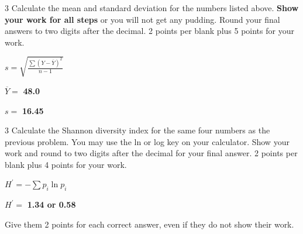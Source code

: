 \showpoints


\question[9]
\begin{multicols}{3}
Calculate the mean and standard deviation for the numbers listed above.
\textbf{Show your work for all steps} or you will not get any pudding. Round your final answers to two digits after the decimal.
2 points per blank plus 5 points for your work. 

\columnbreak

\hfil $ s = \sqrt{\frac{\sum{(Y-\overline{Y})^2}}{n-1}} $ \hfill

\columnbreak

$\overline{Y}=$ \ifprintanswers \textbf{48.0} \else \AnswerBlank \fi

\vspace*{2\baselineskip}

$s = $ \ifprintanswers \textbf{16.45} \else \AnswerBlank \fi


\end{multicols}

\newpage

\question[6]
\begin{multicols}{3}
Calculate the Shannon diversity index for the same four numbers as the previous problem.
You may use the ln or log key on your calculator. 
Show your work and round to two digits after the decimal for your final answer. 
2 points per blank plus 4 points for your work. 


\columnbreak

\hfil $ H^\prime = -\sum{p_i \ln p_i} $ \hfill

\columnbreak

$H^\prime=$ \ifprintanswers \textbf{1.34 or 0.58} \else \AnswerBlank \fi


\end{multicols}

\begin{solution}

Give them 2 points for each correct answer, even if they do not show their work. 

\end{solution}